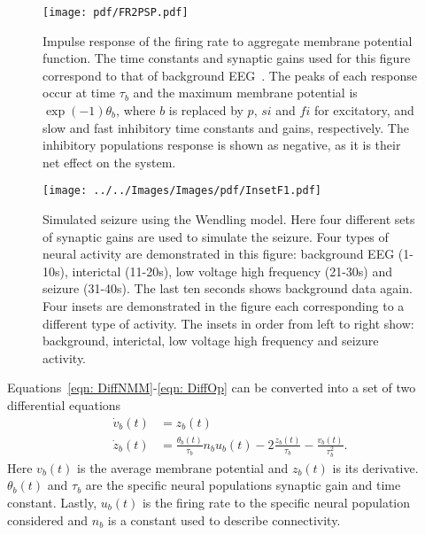 \begin{figure}%
	\centering
		\texttt{[image: pdf/FR2PSP.pdf]}
	\caption{Impulse response of the firing rate to aggregate membrane potential function. The time constants and synaptic gains used for this figure correspond to that of background EEG~\citep{wendling2002epileptic}. The peaks of each response occur at time $\tau_{b}$ and the maximum membrane potential is $\exp(-1)\theta_{b}$, where $b$ is replaced by $p$, $si$ and $fi$ for excitatory, and slow and fast inhibitory time constants and gains, respectively. The inhibitory populations response is shown as negative, as it is their net effect on the system.}
	\label{fig: FR2PSP_final}
\end{figure} %
\begin{figure}%
	\centering
		\texttt{[image: ../../Images/Images/pdf/InsetF1.pdf]}
	\caption{Simulated seizure using the Wendling model. Here four different sets of synaptic gains are used to simulate the seizure. Four types of neural activity are demonstrated in this figure: background EEG (1-10s), interictal (11-20s), low voltage high frequency (21-30s) and seizure (31-40s). The last ten seconds shows background data again. Four insets are demonstrated in the figure each corresponding to a different type of activity. The insets in order from left to right show: background, interictal, low voltage high frequency and seizure activity.}
	\label{fig: SeizureSim}
\end{figure}%
Equations~\ref{eqn: DiffNMM}-\ref{eqn: DiffOp} can be converted into a set of two differential equations \begin{align}%
\label{eqn: FR2PSP1}
\dot{v}_{b}(t)&= z_{b}(t)\\
\label{eqn: FR2PSP2}
\dot{z}_{b}(t)&=\frac{\theta_{b}(t)}{\tau_{b}}n_{b}u_{b}(t)-2\frac{z_{b}(t)}{\tau_{b}}-\frac{v_{b}(t)}{\tau_{b}^{2}}.
\end{align} Here $v_{b}(t)$ is the average membrane potential and $z_{b}(t)$ is its derivative. $\theta_{b}(t)$ and $\tau_{b}$ are the specific neural populations synaptic gain and time constant. Lastly, $u_{b}(t)$ is the firing rate to the specific neural population considered and $n_{b}$ is a constant used to describe connectivity.

